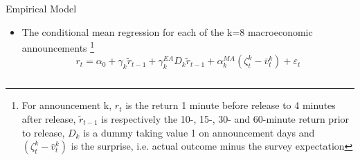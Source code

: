 \documentclass[final]{beamer}
\begin{document}
\begin{frame}
\begin{columns}[t]
\begin{column}{.43 \linewidth}
%
%
%
%
%
%
%
\begin{block}{Empirical Model}

\begin{itemize}

\item The conditional mean regression for each of the k=8 macroeconomic announcements \footnote{For announcement k, $r_{t}$ is the return 1 minute before release to 4 minutes after release, $\tilde{r}_{t-1}$ is respectively the 10-, 15-, 30- and 60-minute return prior to release,
$D_k$ is a dummy taking value 1 on announcement days and $(\zeta _{t}^{k}-\bar{v}_{t}^{k})$ is the surprise, i.e. actual outcome minus the survey expectation}
\[
r_{t}=\alpha _{0}+\gamma _{k}\tilde{r}_{t-1}+\gamma _{k}^{EA}D_{k}\tilde{r}_{t-1}+\alpha _{k}^{MA}(\zeta _{t}^{k}-\bar{v}_{t}^{k})+\varepsilon _{t} 
\]


\end{itemize}
\end{block}
\end{column}
\end{columns}
\end{frame}
\end{document}

